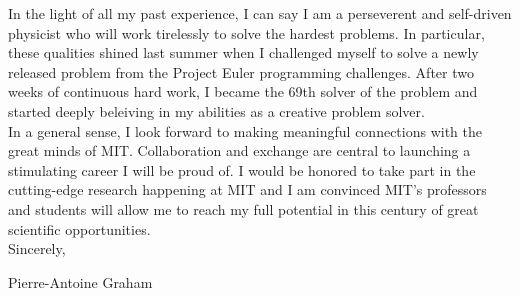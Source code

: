 \documentclass[12pt]{article}
\begin{document}
In the light of all my past experience, I can say I am a perseverent and self-driven physicist who will work tirelessly to solve the hardest problems. In particular, these qualities shined last summer when I challenged myself to solve a newly released problem from the Project Euler programming challenges. After two weeks of continuous hard work, I became the 69th solver of the problem and started deeply beleiving in my abilities as a creative problem solver.\\ 

In a general sense, I look forward to making meaningful connections with the great minds of MIT. Collaboration and exchange are central to launching a stimulating career I will be proud of. I would be honored to take part in the cutting-edge research happening at MIT and I am convinced MIT's professors and students will allow me to reach my full potential in this century of great scientific opportunities.\\

Sincerely,

Pierre-Antoine Graham
\end{document}
